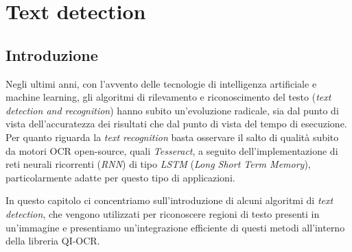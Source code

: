 \chapter{Text detection}
\label{chap:text-detection}


\section{Introduzione}
Negli ultimi anni, con l'avvento delle tecnologie di intelligenza artificiale e machine learning, gli algoritmi di rilevamento e riconoscimento del testo (\textit{text detection and recognition}) hanno subito un'evoluzione radicale, sia dal punto di vista dell'accuratezza dei risultati che dal punto di vista del tempo di esecuzione. Per quanto riguarda la \textit{text recognition} basta osservare il salto di qualit\`a subito da motori OCR open-source, quali \textit{Tesseract}, a seguito dell'implementazione di reti neurali ricorrenti (\textit{RNN}) di tipo \textit{LSTM} (\textit{Long Short Term Memory}), particolarmente adatte per questo tipo di applicazioni.\par
In questo capitolo ci concentriamo sull'introduzione di alcuni algoritmi di \textit{text detection}, che vengono utilizzati per riconoscere regioni di testo presenti in un'immagine e presentiamo un'integrazione efficiente di questi metodi all'interno della libreria QI-OCR. 


